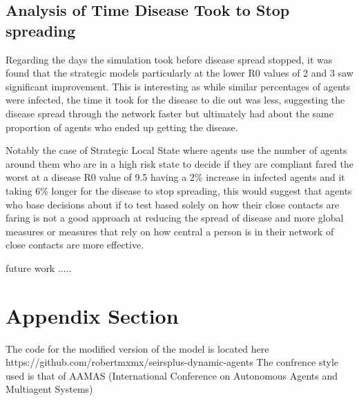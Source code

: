 \documentclass{article}
\begin{document}
\subsection{Analysis of Time Disease Took to Stop spreading}

Regarding the days the simulation took before disease spread stopped, it was found that the strategic models particularly at the lower R0 values of 2 and 3 saw significant improvement. This is interesting as while similar percentages of agents were infected, the time it took for the disease to die out was less, suggesting the disease spread through the network faster but ultimately had about the same proportion of agents who ended up getting the disease.\newline 

Notably the case of Strategic Local State where agents use the number of agents around them who are in a high risk state to decide if they are compliant fared the worst at a disease R0 value of 9.5 having a 2\% increase in infected agents and it taking 6\% longer for the disease to stop spreading, this would suggest that agents who base decisions about if to test based solely on how their close contacts are faring is not a good approach at reducing the spread of disease and more global measures or measures that rely on how central a person is in their network of close contacts are more effective. \newline 

future work .....


\newpage
\appendix

\section{Appendix Section}
The code for the modified version of the model is located here https://github.com/robertmxmx/seirsplus-dynamic-agents
The confrence style used is that of AAMAS (International Conference on Autonomous Agents and Multiagent Systems) 


{}

\end{document}
